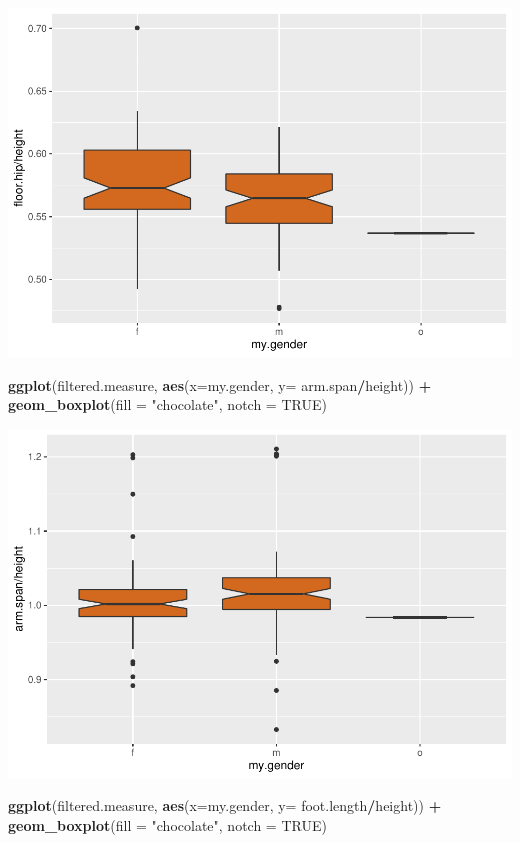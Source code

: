 \documentclass[]{article}
\newenvironment{Shaded}{\begin{snugshade}}{\end{snugshade}}
\newcommand{\DataTypeTok}[1]{\textcolor[rgb]{0.13,0.29,0.53}{#1}}
\newcommand{\KeywordTok}[1]{\textcolor[rgb]{0.13,0.29,0.53}{\textbf{#1}}}
\newcommand{\NormalTok}[1]{#1}
\newcommand{\OperatorTok}[1]{\textcolor[rgb]{0.81,0.36,0.00}{\textbf{#1}}}
\newcommand{\OtherTok}[1]{\textcolor[rgb]{0.56,0.35,0.01}{#1}}
\newcommand{\StringTok}[1]{\textcolor[rgb]{0.31,0.60,0.02}{#1}}
\begin{document}
\includegraphics{project-measure_files/figure-latex/proportions-1.pdf}

\begin{Shaded}
\begin{Highlighting}[]
\KeywordTok{ggplot}\NormalTok{(filtered.measure, }\KeywordTok{aes}\NormalTok{(}\DataTypeTok{x=}\NormalTok{my.gender, }\DataTypeTok{y=}\NormalTok{ arm.span}\OperatorTok{/}\NormalTok{height)) }\OperatorTok{+}
\StringTok{  }\KeywordTok{geom\_boxplot}\NormalTok{(}\DataTypeTok{fill =} \StringTok{"chocolate"}\NormalTok{, }\DataTypeTok{notch =} \OtherTok{TRUE}\NormalTok{)}
\end{Highlighting}
\end{Shaded}

\includegraphics{project-measure_files/figure-latex/proportions-2.pdf}

\begin{Shaded}
\begin{Highlighting}[]
\KeywordTok{ggplot}\NormalTok{(filtered.measure, }\KeywordTok{aes}\NormalTok{(}\DataTypeTok{x=}\NormalTok{my.gender, }\DataTypeTok{y=}\NormalTok{ foot.length}\OperatorTok{/}\NormalTok{height)) }\OperatorTok{+}
\StringTok{  }\KeywordTok{geom\_boxplot}\NormalTok{(}\DataTypeTok{fill =} \StringTok{"chocolate"}\NormalTok{, }\DataTypeTok{notch =} \OtherTok{TRUE}\NormalTok{)}
\end{Highlighting}
\end{Shaded}
\end{document}
